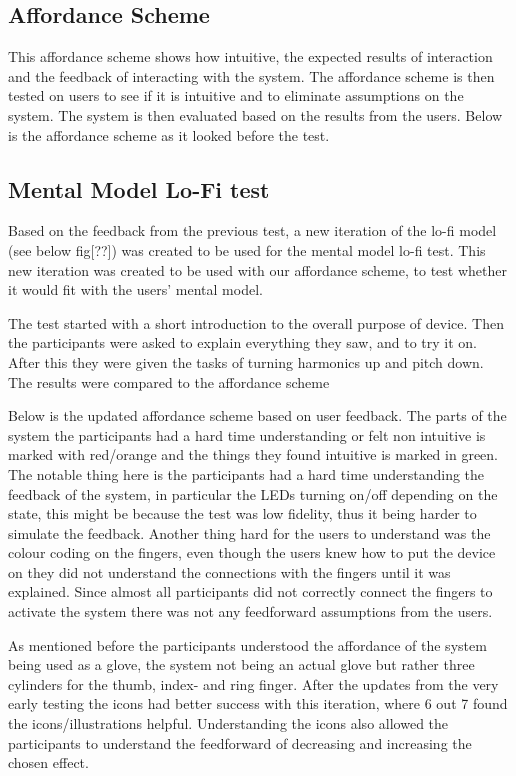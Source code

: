 \subsection{Affordance Scheme}
This affordance scheme shows how intuitive, the expected results of interaction and the feedback of interacting with the system. The affordance scheme is then tested on users to see if it is intuitive and to eliminate assumptions on the system. The system is then evaluated based on the results from the users. Below is the affordance scheme as it looked before the test. 

\subsection{Mental Model Lo-Fi test}

Based on the feedback from the previous test, a new iteration of the lo-fi model (see below fig[??]) was created to be used for the mental model lo-fi test. This new iteration was created to be used with our affordance scheme, to test whether it would fit with the users’ mental model.

The test started with a short introduction to the overall purpose of device. Then the participants were asked to explain everything they saw, and to try it on. After this they were given the tasks of turning harmonics up and pitch down. The results were compared to the affordance scheme 

Below is the updated affordance scheme based on user feedback. The parts of the system the participants had a hard time understanding or felt non intuitive is marked with red/orange and the things they found intuitive is marked in green. The notable thing here is the participants had a hard time understanding the feedback of the system, in particular the LEDs turning on/off depending on the state, this might be because the test was low fidelity, thus it being harder to simulate the feedback. Another thing hard for the users to understand was the colour coding on the fingers, even though the users knew how to put the device on they did not understand the connections with the fingers until it was explained. Since almost all participants did not correctly connect the fingers to activate the system there was not any feedforward assumptions from the users. 

As mentioned before the participants understood the affordance of the system being used as a glove, the system not being an actual glove but rather three cylinders for the thumb, index- and ring finger. After the updates from the very early testing the icons had better success with this iteration, where 6 out 7 found the icons/illustrations helpful. Understanding the icons also allowed the participants to understand the feedforward of decreasing and increasing the chosen effect. 
